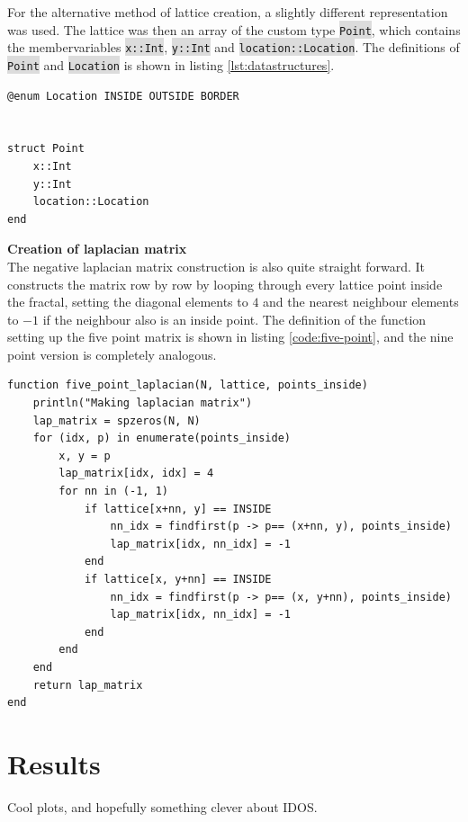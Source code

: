 \documentclass{article}
\begin{document}
For the alternative method of lattice creation, a slightly different representation was used. The lattice was then an array of the custom type \colorbox{gainsboro}{\lstinline{Point}}, which contains the membervariables \colorbox{gainsboro}{\lstinline{x::Int}}, \colorbox{gainsboro}{\lstinline{y::Int}} and \colorbox{gainsboro}{\lstinline{location::Location}}. The definitions of \colorbox{gainsboro}{\lstinline{Point}} and \colorbox{gainsboro}{\lstinline{Location}}
is shown in listing \ref{lst:datastructures}.\\

\begin{lstlisting}[label=lst:datastructures]
@enum Location INSIDE OUTSIDE BORDER


struct Point
    x::Int
    y::Int
    location::Location
end
\end{lstlisting}


\noindent
\textbf{Creation of laplacian matrix}\\
The negative laplacian matrix construction is also quite straight forward. It constructs the matrix row by row by looping through every lattice point inside the fractal, setting the diagonal elements to $4$ and the nearest neighbour elements to $-1$ if the neighbour also is an inside point. The definition of the function setting up the five point matrix is shown in listing \ref{code:five-point}, and the nine point version is completely analogous.\\

\begin{lstlisting}[label=code:five-point]
function five_point_laplacian(N, lattice, points_inside)
    println("Making laplacian matrix")
    lap_matrix = spzeros(N, N)
    for (idx, p) in enumerate(points_inside)
        x, y = p 
        lap_matrix[idx, idx] = 4 
        for nn in (-1, 1)
            if lattice[x+nn, y] == INSIDE
                nn_idx = findfirst(p -> p== (x+nn, y), points_inside)
                lap_matrix[idx, nn_idx] = -1
            end
            if lattice[x, y+nn] == INSIDE
                nn_idx = findfirst(p -> p== (x, y+nn), points_inside)
                lap_matrix[idx, nn_idx] = -1
            end
        end
    end 
    return lap_matrix
end
\end{lstlisting}

\section{Results}
Cool plots, and hopefully something clever about IDOS.
\end{document}
